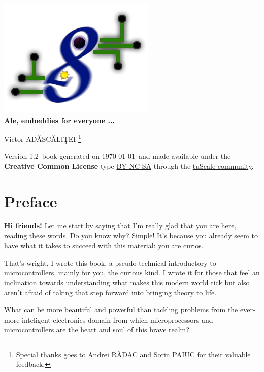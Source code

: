 \documentclass[12pt, a4paper]{book}
\newcommand{\BookAuthor}{Victor \textsc{AD\u ASC\u ALI\c TEI}}
\newcommand{\BookVersion}{1.2}
\newcommand{\InsertBlankPage}{
  \newpage
  \null
  \thispagestyle{empty}
  \newpage
}
\begin{document}

\begin{titlepage}
  \begin{center}
    \includegraphics[scale=0.85]{./img/altele/front_cover_logo.png}~\\[20pt]
    \textbf{\huge Ale, embeddies for everyone ...}\\[30pt]
  \end{center}
  \begin{flushright}
    \BookAuthor
    \footnote[1]{Special thanks goes to Andrei R\u ADAC and Sorin PAIUC for their valuable feedback.}
  \end{flushright}
  
  \vfill
  Version \BookVersion\ book generated on \today\ and made available under the \textbf{Creative Common License} type \href{http://creativecommons.org/licenses/by-nc-sa/3.0/}{BY-NC-SA} through the \href{http://www.tuscale.ro}{tuScale community}. 
\end{titlepage}
\InsertBlankPage

\chapter*{Preface}

\textbf{Hi friends!} Let me start by saying that I'm really glad that you are here, reading these words. Do you know why? Simple! It's because you already seem to have what it takes to succeed with this material: you are curios.

That's wright, I wrote this book, a pseudo-technical introductory to microcontrollers, mainly for you, the curious kind. I wrote it for those that feel an inclination towards understanding what makes this modern world tick but also aren't afraid of taking that step forward into bringing theory to life.

What can be more beautiful and powerful than tackling problems from the ever-more-inteligent electronics domain from which microprocessors and microcontrollers are the heart and soul of this brave realm?
\end{document}
